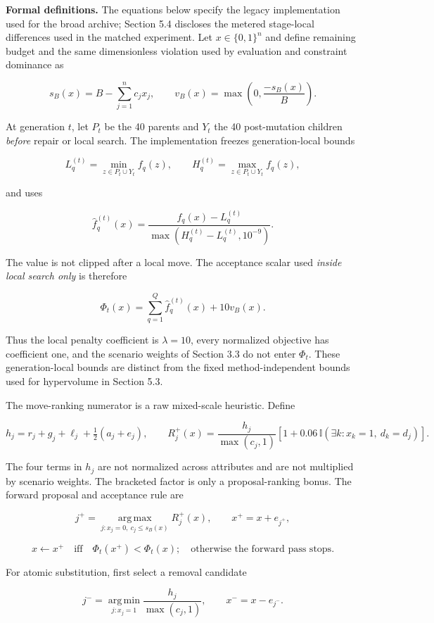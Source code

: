 \documentclass[applsci,article,submit,moreauthors]{Definitions/mdpi}
\begin{document}
\textbf{Formal definitions.} The equations below specify the legacy implementation used for the broad archive; Section 5.4 discloses the metered stage-local differences used in the matched experiment. Let \(x\in\{0,1\}^{n}\) and define remaining budget and the same dimensionless violation used by evaluation and constraint dominance as

\[
s_B(x)=B-\sum_{j=1}^{n}c_jx_j,\qquad
v_B(x)=\max\!\left(0,\frac{-s_B(x)}{B}\right).
\]

At generation \(t\), let \(P_t\) be the 40 parents and \(Y_t\) the 40 post-mutation children \emph{before} repair or local search. The implementation freezes generation-local bounds

\[
L_q^{(t)}=\min_{z\in P_t\cup Y_t} f_q(z),\qquad
H_q^{(t)}=\max_{z\in P_t\cup Y_t} f_q(z),
\]

and uses

\[
\hat f_q^{(t)}(x)=
\frac{f_q(x)-L_q^{(t)}}{\max\!\left(H_q^{(t)}-L_q^{(t)},10^{-9}\right)}.
\]

The value is not clipped after a local move. The acceptance scalar used \emph{inside local search only} is therefore

\[
\Phi_t(x)=\sum_{q=1}^{Q}\hat f_q^{(t)}(x)+10v_B(x).
\]

Thus the local penalty coefficient is \(\lambda=10\), every normalized objective has coefficient one, and the scenario weights of Section 3.3 do not enter \(\Phi_t\). These generation-local bounds are distinct from the fixed method-independent bounds used for hypervolume in Section 5.3.

The move-ranking numerator is a raw mixed-scale heuristic. Define

\[
h_j=r_j+g_j+\ell_j+\tfrac12(a_j+e_j),\qquad
R_j^{+}(x)=\frac{h_j}{\max(c_j,1)}
\left[1+0.06\,\mathbb I\!\left(\exists k:x_k=1,\ d_k=d_j\right)\right].
\]

The four terms in \(h_j\) are not normalized across attributes and are not multiplied by scenario weights. The bracketed factor is only a proposal-ranking bonus. The forward proposal and acceptance rule are

\[
j^+=\operatorname*{arg\,max}_{j:x_j=0,\ c_j\leq s_B(x)}R_j^+(x),
\qquad x^+=x+e_{j^+},
\]

\[
x\leftarrow x^+\quad\text{iff}\quad \Phi_t(x^+)<\Phi_t(x);
\quad\text{otherwise the forward pass stops.}
\]

For atomic substitution, first select a removal candidate

\[
j^-=\operatorname*{arg\,min}_{j:x_j=1}
\frac{h_j}{\max(c_j,1)},\qquad x^-=x-e_{j^-}.
\]
\end{document}
